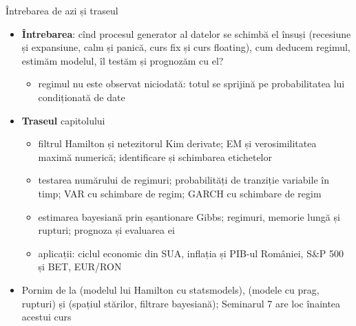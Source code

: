 \begin{frame}{Întrebarea de azi și traseul}
\itemsize{\small}
\begin{itemize}
    \item \textbf{Întrebarea}: cînd procesul generator al datelor se schimbă el însuși (recesiune și expansiune, calm și panică, curs fix și curs floating), cum deducem regimul, estimăm modelul, îl testăm și prognozăm cu el?
    \begin{itemize}
        \item regimul nu este observat niciodată: totul se sprijină pe probabilitatea lui condiționată de date
    \end{itemize}
    \item \textbf{Traseul} capitolului
    \begin{itemize}
        \item filtrul Hamilton și netezitorul Kim derivate; EM și verosimilitatea maximă numerică; identificare și schimbarea etichetelor
        \item testarea numărului de regimuri; probabilități de tranziție variabile în timp; VAR cu schimbare de regim; GARCH cu schimbare de regim
        \item estimarea bayesiană prin eșantionare Gibbs; regimuri, memorie lungă și rupturi; prognoza și evaluarea ei
        \item aplicații: ciclul economic din SUA, inflația și PIB-ul României, S\&P 500 și BET, EUR/RON
    \end{itemize}
    \item Pornim de la  (modelul lui Hamilton cu statsmodels),  (modele cu prag, rupturi) și  (spațiul stărilor, filtrare bayesiană); Seminarul 7 are loc înaintea acestui curs
\end{itemize}
\end{frame}

